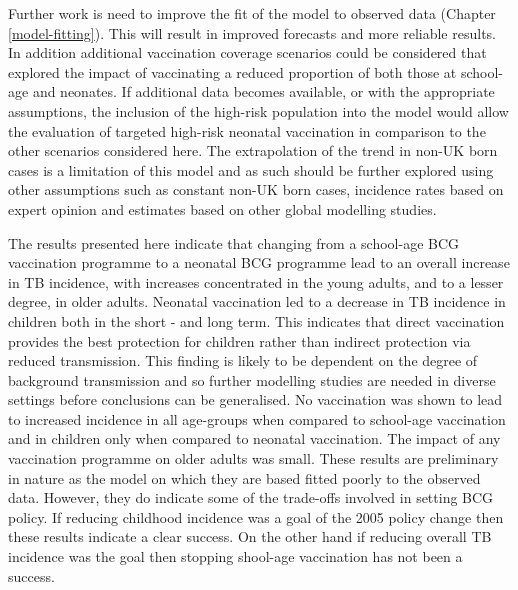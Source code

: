 \documentclass[11pt,twoside]{bristolthesis}
\begin{document}
  Further work is need to improve the fit of the model to observed data (Chapter \ref{model-fitting}). This will result in improved forecasts and more reliable results. In addition additional vaccination coverage scenarios could be considered that explored the impact of vaccinating a reduced proportion of both those at school-age and neonates. If additional data becomes available, or with the appropriate assumptions, the inclusion of the high-risk population into the model would allow the evaluation of targeted high-risk neonatal vaccination in comparison to the other scenarios considered here. The extrapolation of the trend in non-UK born cases is a limitation of this model and as such should be further explored using other assumptions such as constant non-UK born cases, incidence rates based on expert opinion and estimates based on other global modelling studies.
  
  The results presented here indicate that changing from a school-age BCG vaccination programme to a neonatal BCG programme lead to an overall increase in TB incidence, with increases concentrated in the young adults, and to a lesser degree, in older adults. Neonatal vaccination led to a decrease in TB incidence in children both in the short - and long term. This indicates that direct vaccination provides the best protection for children rather than indirect protection via reduced transmission. This finding is likely to be dependent on the degree of background transmission and so further modelling studies are needed in diverse settings before conclusions can be generalised. No vaccination was shown to lead to increased incidence in all age-groups when compared to school-age vaccination and in children only when compared to neonatal vaccination. The impact of any vaccination programme on older adults was small. These results are preliminary in nature as the model on which they are based fitted poorly to the observed data. However, they do indicate some of the trade-offs involved in setting BCG policy. If reducing childhood incidence was a goal of the 2005 policy change then these results indicate a clear success. On the other hand if reducing overall TB incidence was the goal then stopping shool-age vaccination has not been a success.
  
\end{document}
